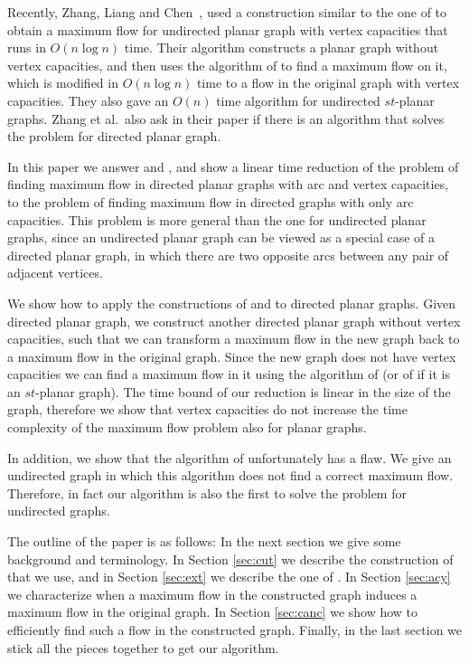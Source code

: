 \documentclass[a4paper,11pt]{article}
\begin{document}
Recently, Zhang, Liang and Chen~\cite{ZLC08}, used a construction
similar to the one of \cite{KN94} to obtain a maximum flow for
undirected planar graph with vertex capacities that runs in $O(n\log
n)$ time. Their algorithm constructs a planar graph without vertex
capacities, and then uses the algorithm of \cite{BK} to find a
maximum flow on it, which is modified in $O(n\log n)$ time to a
flow in the original graph with vertex capacities.
They also gave an $O(n)$ time algorithm for undirected
$st$-planar graphs. Zhang et al.\ also ask in their paper if there
is an algorithm that solves the problem for directed planar graph.

In this paper we answer \cite{BK} and \cite{ZLC08},  and show a
linear time reduction of the problem of finding maximum flow in
directed planar graphs with arc and vertex capacities, to the
problem of finding maximum flow in directed graphs with only arc
capacities. This problem is more general than the one for undirected
planar graphs, since an undirected planar graph can be viewed as a
special case of a directed planar graph, in which there are two
opposite arcs between any pair of adjacent vertices.

We show how to apply the constructions of \cite{KN94} and \cite{ZLC08}
to directed planar graphs.
Given directed planar graph, we construct another directed planar graph
without vertex capacities, such that we can transform a maximum flow
in the new graph  back to a maximum flow in the original graph.
Since the new graph does not have vertex capacities we can find a
maximum flow in it using  the algorithm of \cite{BK} (or of
\cite{H81} if it is an $st$-planar graph). The time bound of our
reduction is linear in the size of the graph, therefore we show that
vertex capacities do not increase the time complexity of the maximum
flow problem also for planar graphs.



In addition, we show that the algorithm of \cite{ZLC08}
unfortunately has a flaw. We give an undirected graph in  which this
algorithm does not find a correct maximum flow. Therefore, in fact our
algorithm is also the first to solve the problem for undirected
graphs.

The outline of the paper is as follows: In the next  section we give
some background and terminology. In Section \ref{sec:cut} we
describe the construction of \cite{KN94} that we use, and in Section
\ref{sec:ext} we describe the one of \cite{ZLC08}. In Section
\ref{sec:acy} we characterize when a maximum flow in the constructed graph
induces a maximum flow in the original graph. In Section
\ref{sec:canc} we show how to efficiently find such a flow in the
constructed graph.  Finally, in the last section we stick all the
pieces together to get our algorithm.
\end{document}
